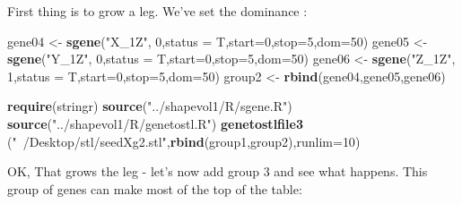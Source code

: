 \documentclass[]{article}
\newenvironment{Shaded}{\begin{snugshade}}{\end{snugshade}}
\newcommand{\DataTypeTok}[1]{\textcolor[rgb]{0.13,0.29,0.53}{#1}}
\newcommand{\DecValTok}[1]{\textcolor[rgb]{0.00,0.00,0.81}{#1}}
\newcommand{\KeywordTok}[1]{\textcolor[rgb]{0.13,0.29,0.53}{\textbf{#1}}}
\newcommand{\NormalTok}[1]{#1}
\newcommand{\StringTok}[1]{\textcolor[rgb]{0.31,0.60,0.02}{#1}}
\begin{document}
First thing is to grow a leg. We've set the dominance :

\begin{Shaded}
\begin{Highlighting}[]
\NormalTok{gene04 <-}\StringTok{ }\KeywordTok{sgene}\NormalTok{(}\StringTok{"X_1Z"}\NormalTok{,          }\DecValTok{0}\NormalTok{,}\DataTypeTok{status =}\NormalTok{ T,}\DataTypeTok{start=}\DecValTok{0}\NormalTok{,}\DataTypeTok{stop=}\DecValTok{5}\NormalTok{,}\DataTypeTok{dom=}\DecValTok{50}\NormalTok{)}
\NormalTok{gene05 <-}\StringTok{ }\KeywordTok{sgene}\NormalTok{(}\StringTok{"Y_1Z"}\NormalTok{,          }\DecValTok{0}\NormalTok{,}\DataTypeTok{status =}\NormalTok{ T,}\DataTypeTok{start=}\DecValTok{0}\NormalTok{,}\DataTypeTok{stop=}\DecValTok{5}\NormalTok{,}\DataTypeTok{dom=}\DecValTok{50}\NormalTok{)}
\NormalTok{gene06 <-}\StringTok{ }\KeywordTok{sgene}\NormalTok{(}\StringTok{"Z_1Z"}\NormalTok{,          }\DecValTok{1}\NormalTok{,}\DataTypeTok{status =}\NormalTok{ T,}\DataTypeTok{start=}\DecValTok{0}\NormalTok{,}\DataTypeTok{stop=}\DecValTok{5}\NormalTok{,}\DataTypeTok{dom=}\DecValTok{50}\NormalTok{)}
\NormalTok{group2 <-}\StringTok{ }\KeywordTok{rbind}\NormalTok{(gene04,gene05,gene06)}
\end{Highlighting}
\end{Shaded}

\begin{Shaded}
\begin{Highlighting}[]
\KeywordTok{require}\NormalTok{(stringr)}
\KeywordTok{source}\NormalTok{(}\StringTok{"../shapevol1/R/sgene.R"}\NormalTok{)}
\KeywordTok{source}\NormalTok{(}\StringTok{"../shapevol1/R/genetostl.R"}\NormalTok{)}
\KeywordTok{genetostlfile3}\NormalTok{   (}\StringTok{"~/Desktop/stl/seedXg2.stl"}\NormalTok{,}\KeywordTok{rbind}\NormalTok{(group1,group2),}\DataTypeTok{runlim=}\DecValTok{10}\NormalTok{)}
\end{Highlighting}
\end{Shaded}

OK, That grows the leg - let's now add group 3 and see what happens.
This group of genes can make most of the top of the table:
\end{document}
